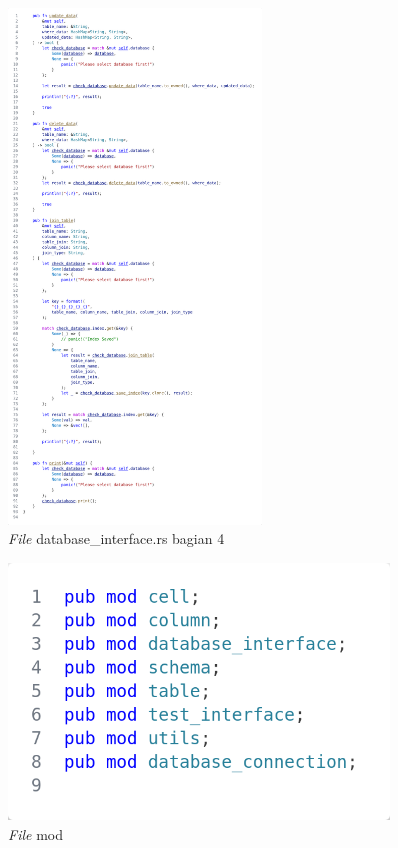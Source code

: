 \begin{figure}[H]
  \centering{}
	\includegraphics[width=0.6\textwidth]{gambar/lampiran/file-database-interface-4.png}
  \caption{\emph{File} database\_interface.rs bagian 4}
\end{figure}


\begin{figure}[H]
  \centering{}
	\includegraphics[width=0.9\textwidth]{gambar/lampiran/file-mod.png}
  \caption{\emph{File} mod}
\end{figure}


